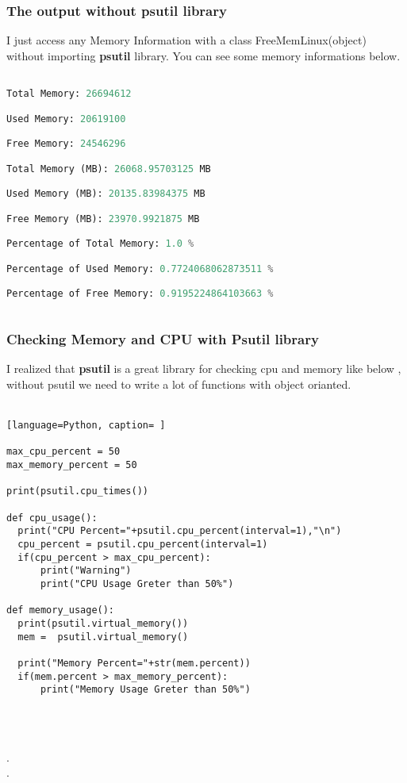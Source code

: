 \documentclass[onecolumn]{article}
\begin{document}
\subsubsection{The output without psutil library}
I just access any Memory Information with a class FreeMemLinux(object) without importing \textbf{psutil} library. You can see some memory informations below.

\begin{lstlisting}[language=Python, caption= Output]

Total Memory: 26694612 

Used Memory: 20619100 

Free Memory: 24546296 

Total Memory (MB): 26068.95703125 MB

Used Memory (MB): 20135.83984375 MB

Free Memory (MB): 23970.9921875 MB

Percentage of Total Memory: 1.0 %

Percentage of Used Memory: 0.7724068062873511 %

Percentage of Free Memory: 0.9195224864103663 %
    
\end{lstlisting}

\subsubsection{Checking Memory and CPU with Psutil library}

I realized that \textbf{psutil} is a great library for checking cpu and memory like below , without psutil we need to write a lot of functions with object orianted.\\\\


\begin{lstlisting}[language=Python, caption= ]

max_cpu_percent = 50
max_memory_percent = 50
    
print(psutil.cpu_times())

def cpu_usage():
  print("CPU Percent="+psutil.cpu_percent(interval=1),"\n")
  cpu_percent = psutil.cpu_percent(interval=1)
  if(cpu_percent > max_cpu_percent):
      print("Warning")
      print("CPU Usage Greter than 50%")
    
def memory_usage():
  print(psutil.virtual_memory())
  mem =  psutil.virtual_memory()

  print("Memory Percent="+str(mem.percent))
  if(mem.percent > max_memory_percent):
      print("Memory Usage Greter than 50%")
    
   
\end{lstlisting}
\\.
\\.
\end{document}
